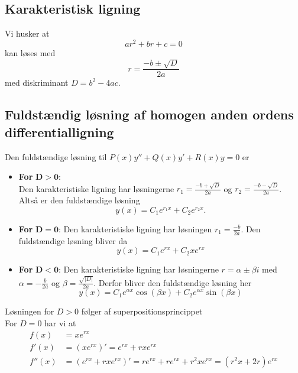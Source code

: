 \subsection{Karakteristisk ligning}
Vi husker at
\[
  ar^2 +br+c = 0
\]
kan løses med
\[
r = \frac{-b \pm \sqrt{D} }{2a} 
\]
med diskriminant $D = b^2 - 4ac$.

\subsection{Fuldstændig løsning af homogen anden ordens differentialligning}
\begin{sæt}
Den fuldstændige løsning til $P(x)y'' + Q(x)y' + R(x)y = 0$ er
\begin{itemize}
  \item \textbf{For} $\mathbf{D>0}$: \\
    Den karakteristiske ligning har løsningerne $r_1 = \frac{-b+\sqrt{D} }{2a}$ og $r_2 = \frac{-b-\sqrt{D} }{2a}$. Altså er den fuldstændige løsning
    \begin{equation}
      y(x) = C_1e^{r_1x} + C_2e^{r_2x}.
    \end{equation}
  \item \textbf{For} $\mathbf{D=0}$:
    Den karakteristiske ligning har løsningen $r_1 = \frac{-b}{2a}$. Den fuldstændige løsning bliver da
  \begin{equation}
     y(x) = C_1e^{rx} + C_2xe^{rx}
  \end{equation}
\item \textbf{For} $\mathbf{D<0}$:
    Den karakteristiske ligning har løsningerne $r = \alpha \pm \beta i$ med $\alpha = -\frac{b}{2a}$ og $\beta = \frac{\sqrt{|D|}}{2a}$. Derfor bliver den fuldstændige løsning her
    \begin{equation}
      y(x) = C_1e^{\alpha x}\cos \left( \beta x \right) + C_2e^{\alpha x} \sin \left( \beta x \right) 
    \end{equation}
\end{itemize}
\tcblower
  Løsningen for $D>0$ følger af superpositionsprincippet \\
  \hr
  For $D=0$ har vi at
  \begin{align*}
    f(x) &= xe^{rx} \\
    f'(x) &= \left( xe^{rx} \right)' = e^{rx} + rxe^{rx}   \\
    f''(x) &= (e^{rx} +rxe^{rx})' = re^{rx} + re^{rx} + r^{2}xe^{rx} = \left( r^2x+2r \right)e^{rx}      \\

\end{align*}
\end{sæt}
